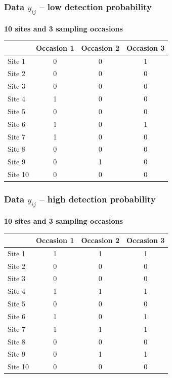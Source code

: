 \documentclass[color=usenames,dvipsnames]{beamer}\usepackage[]{graphicx}\usepackage[]{color}
\begin{document}
\begin{frame}
  \frametitle{Data $y_{ij}$ -- low detection probability}
  {\bf \centering \large 10 sites and 3 sampling occasions \par}
  \vspace{0.3cm}
  \begin{center}
    \small
    \begin{tabular}{lccc}
      \hline
      & Occasion 1 & Occasion 2 & Occasion 3 \\
      \hline
      Site 1 & 0 & 0 & 1 \\
      Site 2 & 0 & 0 & 0 \\
      Site 3 & 0 & 0 & 0 \\
      Site 4 & 1 & 0 & 0 \\
      Site 5 & 0 & 0 & 0 \\
      Site 6 & 1 & 0 & 1 \\
      Site 7 & 1 & 0 & 0 \\
      Site 8 & 0 & 0 & 0 \\
      Site 9 & 0 & 1 & 0 \\
      Site 10 & 0 & 0 & 0 \\
      \hline
    \end{tabular}
  \end{center}
\end{frame}





\begin{frame}
  \frametitle{Data $y_{ij}$ -- high detection probability}
  {\bf \centering \large 10 sites and 3 sampling occasions \par}
  \vspace{0.3cm}
  \begin{center}
    \small
    \begin{tabular}{lccc}
      \hline
      & Occasion 1 & Occasion 2 & Occasion 3 \\
      \hline
      Site 1 & 1 & 1 & 1 \\
      Site 2 & 0 & 0 & 0 \\
      Site 3 & 0 & 0 & 0 \\
      Site 4 & 1 & 1 & 1 \\
      Site 5 & 0 & 0 & 0 \\
      Site 6 & 1 & 0 & 1 \\
      Site 7 & 1 & 1 & 1 \\
      Site 8 & 0 & 0 & 0 \\
      Site 9 & 0 & 1 & 1 \\
      Site 10 & 0 & 0 & 0 \\
      \hline
    \end{tabular}
  \end{center}
\end{frame}
\end{document}
